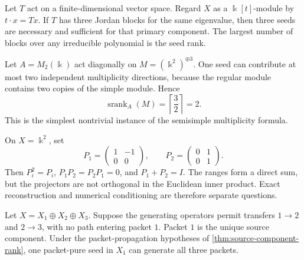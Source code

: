 \documentclass[11pt]{article}
\theoremstyle{definition}
\theoremstyle{remark}
\theoremstyle{definition}\newtheorem{example}[theorem]{Example}
\newcommand{\bbk}{\Bbbk}
\newcommand{\srank}{\operatorname{srank}}
\begin{document}
\begin{microexample}[title={R1: one operator with several primary blocks}]
Let \(T\) act on a finite-dimensional vector space.  Regard \(X\) as a \(\bbk[t]\)-module by \(t\cdot x=Tx\).  If \(T\) has three Jordan blocks for the same eigenvalue, then three seeds are necessary and sufficient for that primary component.  The largest number of blocks over any irreducible polynomial is the seed rank.
\end{microexample}

\begin{microexample}[title={R2: a matrix algebra with multiplicity}]
Let \(A=M_2(\bbk)\) act diagonally on \(M=(\bbk^2)^{\oplus3}\).  One seed can contribute at most two independent multiplicity directions, because the regular module contains two copies of the simple module.  Hence
\[
\srank_A(M)=\left\lceil\frac{3}{2}\right\rceil=2.
\]
This is the simplest nontrivial instance of the semisimple multiplicity formula.
\end{microexample}

\begin{microexample}[title={R3: an exact but oblique packet split}]
On \(X=\bbk^2\), set
\[
P_1=\begin{pmatrix}1&-1\\0&0\end{pmatrix},
\qquad
P_2=\begin{pmatrix}0&1\\0&1\end{pmatrix}.
\]
Then \(P_i^2=P_i\), \(P_1P_2=P_2P_1=0\), and \(P_1+P_2=I\).  The ranges form a direct sum, but the projectors are not orthogonal in the Euclidean inner product.  Exact reconstruction and numerical conditioning are therefore separate questions.
\end{microexample}

\begin{microexample}[title={R4: a directed packet system}]
Let \(X=X_1\oplus X_2\oplus X_3\).  Suppose the generating operators permit transfers \(1\to2\) and \(2\to3\), with no path entering packet \(1\).  Packet \(1\) is the unique source component.  Under the packet-propagation hypotheses of \cref{thm:source-component-rank}, one packet-pure seed in \(X_1\) can generate all three packets.
\end{microexample}
\end{document}
